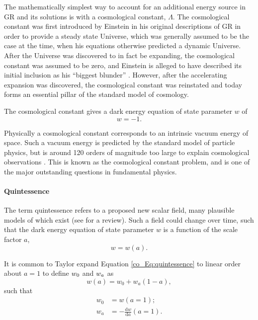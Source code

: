 The mathematically simplest way to account for an additional energy source in GR and its solutions is with a cosmological constant, $\Lambda$. The cosmological constant was first introduced by Einstein in his original descriptions of GR \citep{Einstein1917} in order to provide a steady state Universe, which was generally assumed to be the case at the time, when his equations otherwise predicted a dynamic Universe. After the Universe was discovered to in fact be expanding, the cosmological constant was assumed to be zero, and Einstein is alleged to have described its initial inclusion as his ``biggest blunder'' \citep{ORaifeartaigh2018}. However, after the accelerating expansion was discovered, the cosmological constant was reinstated and today forms an essential pillar of the \lcdm{} standard model of cosmology.

The cosmological constant gives a dark energy equation of state parameter $w$ of
\begin{equation}
w = -1.
\end{equation}

Physically a cosmological constant corresponds to an intrinsic vacuum energy of space. Such a vacuum energy is predicted by the standard model of particle physics, but is around 120 orders of magnitude too large to explain cosmological observations \citep[e.g.][]{Adler1995}. This is known as the cosmological constant problem, and is one of the major outstanding questions in fundamental physics.

\paragraph{Quintessence}

The term quintessence refers to a proposed new scalar field, many plausible models of which exist (see \citealt{Tsujikawa2013} for a review). Such a field could change over time, such that the dark energy equation of state parameter $w$ is a function of the scale factor $a$,
\begin{equation}
w = w \left( a \right).
\label{co_Eq:quintessence}
\end{equation}

It is common to Taylor expand Equation \eqref{co_Eq:quintessence} to linear order about $a = 1$ to define $w_0$ and $w_a$ as
\begin{equation}
w \left( a \right) = w_0 + w_a \left( 1 - a \right),
\label{co_Eq:w_a_taylor}
\end{equation}
such that
\begin{align}
w_0 &= w \left( a = 1 \right);
\\
w_a &= - \frac{\text{d}w}{\text{d}a} \left( a = 1 \right).
\label{co_Eq:wa}
\end{align}

